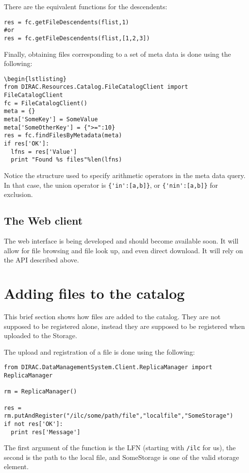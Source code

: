 \documentclass[11pt,a4paper]{scrartcl}
\begin{document}
There are the equivalent functions for the descendents:
\begin{lstlisting}
res = fc.getFileDescendents(flist,1)
#or
res = fc.getFileDescendents(flist,[1,2,3])
\end{lstlisting}

Finally, obtaining files corresponding to a set of meta data is done using the
following:
\begin{lstlisting}
\begin{lstlisting}
from DIRAC.Resources.Catalog.FileCatalogClient import FileCatalogClient
fc = FileCatalogClient()
meta = {}
meta['SomeKey'] = SomeValue
meta['SomeOtherKey'] = {">=":10}
res = fc.findFilesByMetadata(meta)
if res['OK']:
  lfns = res['Value']
  print "Found %s files"%len(lfns)
\end{lstlisting}
Notice the structure used to specify arithmetic operators in the meta data
query. In that case, the union operator is \lstinline|{'in':[a,b]}|, or
\lstinline|{'nin':[a,b]}| for exclusion.

\subsection{The Web client}
The web interface is being developed and should become available soon. It will
allow for file browsing and file look up, and even direct download. It will rely
on the API described above.

\section{Adding files to the catalog}\label{sec:addingfiles}
This brief section shows how files are added to the catalog. They are not
supposed to be registered alone, instead they are supposed to be registered when
uploaded to the Storage.

The upload and registration of a file is done using the following:
\begin{lstlisting}
from DIRAC.DataManagementSystem.Client.ReplicaManager import ReplicaManager

rm = ReplicaManager()

res = rm.putAndRegister("/ilc/some/path/file","localfile","SomeStorage")
if not res['OK']:
  print res['Message']
\end{lstlisting}
The first argument of the function is the LFN (starting with \lstinline|/ilc|
for us), the second is the path to the local file, and SomeStorage is one of the valid
storage element. 
\end{document}
